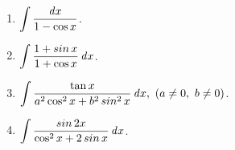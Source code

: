 \documentclass[a4paper,punct=CCT]{ctexbook}
\theoremstyle{definition}
\theoremstyle{remark}
\newif\ifshowsol
\begin{document}
\begin{enumerate}
\item \(\displaystyle \int \frac{\mathop{}\!\mathit{d} x}{1 - \cos x}\).

  \ifshowsol
  同样用\(t = \tan\frac{x}{2}\)做换元, 有
  \[
    \begin{split}
      \int \frac{dx}{1-\cos x}
      = \int \frac{1}{\scriptstyle 1-\tfrac{1-t^2}{1+t^2}} \frac{2}{1+t^2} \dt
      = \int \frac{dt}{t^2}
      = - \frac1t + C
      = - \cot\frac{x}{2} + C.
    \end{split}
  \]
  \fi

\item \(\displaystyle \int \frac{1 + \operatorname{\smash{sin}} x}{1 + \cos x} \mathop{}\!\mathit{d} x\).

  \ifshowsol
  同样用\(t = \tan\frac{x}{2}\)做换元, 有
  \[
    \begin{split}
      \int \frac{1 + \sin x}{1 + \cos x} \dx
      &= \int \tfrac{1 + \tfrac{2t}{1+t^2}}{1+\tfrac{1-t^2}{1+t^2}} \frac{2}{1+t^2} \dt
      = \int \paren[\Big]{1 + \frac{2t}{1+t^2}} \dt \\
      &= t + \ln\paren{1+t^2} + C
      = \tan\frac{x}{2} + \ln\sec^2\frac{x}{2} + C \\
      &= \tan\frac{x}{2} + \ln\frac{2}{1 + \cos x} + C
      = \tan\frac{x}{2} - \ln\paren{1 + \cos x} + C.
    \end{split}
  \]
  \fi

\item \(\displaystyle \int \frac{\tan x}{a^2 \cos^2 x + b^2 \operatorname{\smash{sin}}^2 x} \mathop{}\!\mathit{d} x,\ (a \ne 0,\ b \ne 0)\).

  \ifshowsol
  用\(u = \tan x\)做换元, 有
  \[
    \begin{split}
      \int \frac{\tan x}{a^2 \cos^2 x + b^2 \sin^2 x} \dx
      &= \int \frac{\tan x}{a^2 + b^2 \tan^2 x} \frac{1}{\cos^2 x} \dx
      = \int \frac{u}{a^2 + b^2 u^2} \du \\
      &= \frac1{2b^2} \ln\paren{a^2 + b^2 u^2} + C
      = \frac1{2b^2} \ln\paren{a^2 + b^2 \tan^2 x} + C.
    \end{split}
  \]
  \fi

\item \(\displaystyle \int \frac{\operatorname{\smash{sin}} 2x}{\cos^2 x + 2 \operatorname{\smash{sin}} x} \mathop{}\!\mathit{d} x\).


\end{enumerate}
\end{document}
